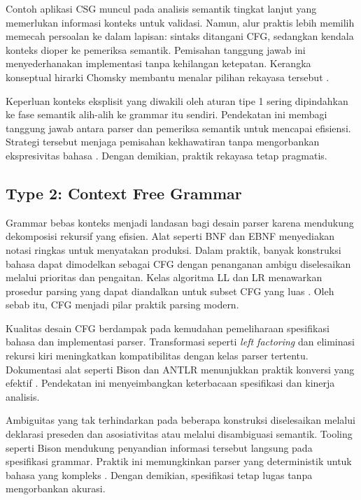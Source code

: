 \documentclass[../main.tex]{subfiles}
\begin{document}
Contoh aplikasi CSG muncul pada analisis semantik tingkat lanjut yang memerlukan informasi konteks untuk validasi. Namun, alur praktis lebih memilih memecah persoalan ke dalam lapisan: sintaks ditangani CFG, sedangkan kendala konteks dioper ke pemeriksa semantik. Pemisahan tanggung jawab ini menyederhanakan implementasi tanpa kehilangan ketepatan. Kerangka konseptual hirarki Chomsky membantu menalar pilihan rekayasa tersebut \citep{WikiChomsky}.

Keperluan konteks eksplisit yang diwakili oleh aturan tipe 1 sering dipindahkan ke fase semantik alih-alih ke grammar itu sendiri. Pendekatan ini membagi tanggung jawab antara parser dan pemeriksa semantik untuk mencapai efisiensi. Strategi tersebut menjaga pemisahan kekhawatiran tanpa mengorbankan ekspresivitas bahasa \citep{WikiChomsky}. Dengan demikian, praktik rekayasa tetap pragmatis.

\subsection{Type 2: Context Free Grammar}
Grammar bebas konteks menjadi landasan bagi desain parser karena mendukung dekomposisi rekursif yang efisien. Alat seperti BNF dan EBNF menyediakan notasi ringkas untuk menyatakan produksi. Dalam praktik, banyak konstruksi bahasa dapat dimodelkan sebagai CFG dengan penanganan ambigu diselesaikan melalui prioritas dan pengaitan. Kelas algoritma LL dan LR menawarkan prosedur parsing yang dapat diandalkan untuk subset CFG yang luas \citep{WikiLL,WikiLR}. Oleh sebab itu, CFG menjadi pilar praktik parsing modern.

Kualitas desain CFG berdampak pada kemudahan pemeliharaan spesifikasi bahasa dan implementasi parser. Transformasi seperti \emph{left factoring} dan eliminasi rekursi kiri meningkatkan kompatibilitas dengan kelas parser tertentu. Dokumentasi alat seperti Bison dan ANTLR menunjukkan praktik konversi yang efektif \citep{BisonManual,ANTLRDocs}. Pendekatan ini menyeimbangkan keterbacaan spesifikasi dan kinerja analisis.

Ambiguitas yang tak terhindarkan pada beberapa konstruksi diselesaikan melalui deklarasi preseden dan asosiativitas atau melalui disambiguasi semantik. Tooling seperti Bison mendukung penyandian informasi tersebut langsung pada spesifikasi grammar. Praktik ini memungkinkan parser yang deterministik untuk bahasa yang kompleks \citep{BisonManual}. Dengan demikian, spesifikasi tetap lugas tanpa mengorbankan akurasi.
\end{document}
